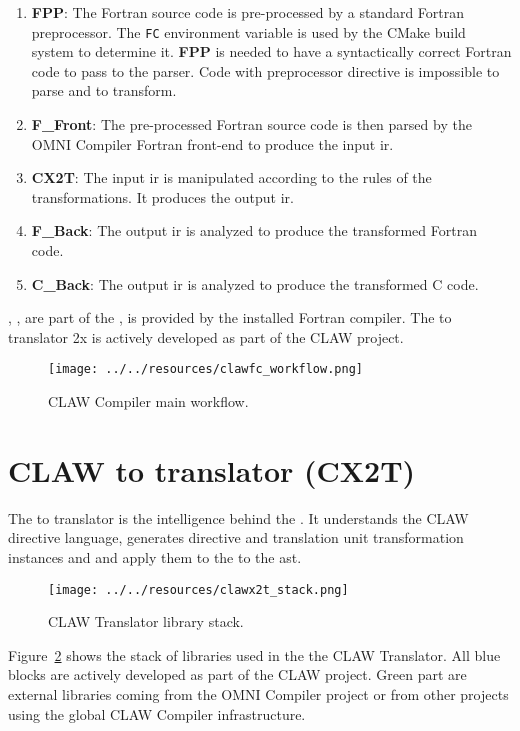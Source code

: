 \begin{enumerate}
\item \textbf{FPP}: The Fortran source code is pre-processed by a standard
Fortran preprocessor.
The \lstinline|FC| environment variable is used by the CMake build system to
determine it. \textbf{FPP} is needed to have a syntactically correct Fortran
code to pass to the parser. Code with preprocessor directive is impossible
to parse and to transform.
\item \textbf{F\_Front}: The pre-processed Fortran source code is then parsed
by the OMNI Compiler Fortran front-end to produce the input \xcodemlf \gls{ir}.
\item \textbf{CX2T}: The input \xcodemlf \gls{ir} is manipulated according to
the rules of the transformations. It produces the output \xcodeml \gls{ir}.
\item \textbf{F\_Back}: The output \xcodemlf \gls{ir} is analyzed to produce
the transformed Fortran code.
\item \textbf{C\_Back}: The output \xcodemlc \gls{ir} is analyzed to produce
the transformed C code.
\end{enumerate}

\ffront{}, \fback{}, \cback{} are part of the \omni{}, \fpp{} is provided by the
installed Fortran compiler. The \xcodemlf to \xcodeml translator \cx2x{} is
actively developed as part of the CLAW project.

\begin{figure}[!ht]
  \centering
  \texttt{[image: ../../resources/clawfc\_workflow.png]} \\
  \caption{CLAW Compiler main workflow.}
  \label{fig:clawfc_main_workflow}
\end{figure}

\section{CLAW \xcodemlf to \xcodeml translator (CX2T)}
The \xcodemlf to \xcodeml translator is the intelligence behind the \clawfcomp.
It understands the CLAW directive language, generates directive and translation
unit transformation instances and and apply them to the to the \xcodeml
\gls{ast}.

\begin{figure}[!ht]
  \centering
  \texttt{[image: ../../resources/clawx2t\_stack.png]} \\
  \caption{CLAW \xcodemlf Translator library stack.}
  \label{fig:clawx2_stack}
\end{figure}

Figure~\ref{fig:clawx2_stack} shows the stack of libraries used in the the CLAW
\xcodemlf Translator. All blue blocks are actively developed as part of the CLAW
project. Green part are external libraries coming from the OMNI Compiler project
or from other projects using the global CLAW Compiler infrastructure.
